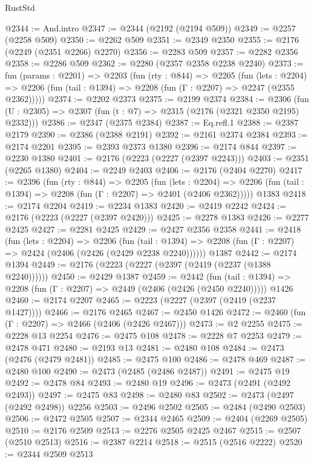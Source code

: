 \begin{lexlean}{RustStd}
\begin{coremodule}
@2344 := And.intro
@2347 := @2344 (@2192 (@2194 @509))
@2349 := @2257 (@2258 @509)
@2350 := @2262 @509
@2351 := @2349 @2350
@2355 := @2176 (@2249 (@2351 @2266) @2270)
@2356 := @2283 @509
@2357 := @2282 @2356
@2358 := @2286 @509
@2362 := @2280 (@2357 @2358 @2238 @2240)
@2373 := fun (params : @2201) =>
  @2203
    (fun (rty : @844) =>
    @2205
      (fun (lets : @2204) =>
      @2206 (fun (tail : @1394) => @2208 (fun (Γ : @2207) => @2247 (@2355 @2362)))))
@2374 := @2202 @2373
@2375 := @2199 @2374
@2384 := @2306 (fun (U : @2305) => @2307 (fun (t : @7) => @2315 (@2176 (@2321 @2350 @2195) @2332)))
@2386 := @2347 (@2375 @2384)
@2387 := Eq.refl.{1}
@2388 := @2387 @2179
@2390 := @2386 (@2388 @2191)
@2392 := @2161 @2374 @2384
@2393 := @2174 @2201
@2395 := @2393 @2373 @1380
@2396 := @2174 @844
@2397 := @2230 @1380
@2401 := @2176 (@2223 (@2227 (@2397 @2243)))
@2403 := @2351 (@2265 @1380)
@2404 := @2249 @2403
@2406 := @2176 (@2404 @2270)
@2417 := @2396
    (fun (rty : @844) =>
    @2205
      (fun (lets : @2204) =>
      @2206 (fun (tail : @1394) => @2208 (fun (Γ : @2207) => @2401 (@2406 @2362)))))
    @1383
@2418 := @2174 @2204
@2419 := @2234 @1383
@2420 := @2419 @2242
@2424 := @2176 (@2223 (@2227 (@2397 @2420)))
@2425 := @2278 @1383
@2426 := @2277 @2425
@2427 := @2281 @2425
@2429 := @2427 @2356 @2358
@2441 := @2418
    (fun (lets : @2204) =>
    @2206
      (fun (tail : @1394) => @2208 (fun (Γ : @2207) => @2424 (@2406 (@2426 (@2429 @2238 @2240))))))
    @1387
@2442 := @2174 @1394
@2449 := @2176 (@2223 (@2227 (@2397 (@2419 (@2237 (@1388 @2240))))))
@2450 := @2429 @1387
@2459 := @2442
    (fun (tail : @1394) => @2208 (fun (Γ : @2207) => @2449 (@2406 (@2426 (@2450 @2240)))))
    @1426
@2460 := @2174 @2207
@2465 := @2223 (@2227 (@2397 (@2419 (@2237 @1427))))
@2466 := @2176 @2465
@2467 := @2450 @1426
@2472 := @2460 (fun (Γ : @2207) => @2466 (@2406 (@2426 @2467)))
@2473 := @2 @2255
@2475 := @2228 @13 @2254
@2476 := @2475 @108
@2478 := @2228 @7 @2253
@2479 := @2478 @471
@2480 := @2193 @13
@2481 := @2480 @108
@2484 := @2473 (@2476 (@2479 @2481))
@2485 := @2475 @100
@2486 := @2478 @469
@2487 := @2480 @100
@2490 := @2473 (@2485 (@2486 @2487))
@2491 := @2475 @19
@2492 := @2478 @84
@2493 := @2480 @19
@2496 := @2473 (@2491 (@2492 @2493))
@2497 := @2475 @83
@2498 := @2480 @83
@2502 := @2473 (@2497 (@2492 @2498)) @2256
@2503 := @2496 @2502
@2505 := @2484 (@2490 @2503)
@2506 := @2472 @2505
@2507 := @2344 @2465
@2509 := @2404 (@2269 @2505)
@2510 := @2176 @2509
@2513 := @2276 @2505 @2425 @2467
@2515 := @2507 (@2510 @2513)
@2516 := @2387 @2214
@2518 := @2515 (@2516 @2222)
@2520 := @2344 @2509 @2513

\end{coremodule}
\end{lexlean}
